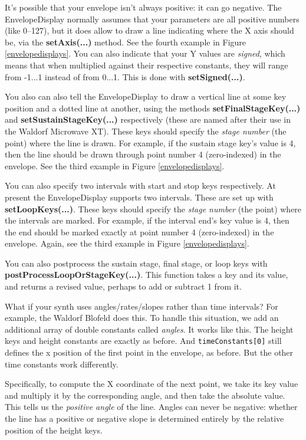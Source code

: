 \documentclass{article}
\begin{document}
\begin{itemize}
It's possible that your envelope isn't always positive: it can go negative.   The EnvelopeDisplay normally assumes that your parameters are all positive numbers (like 0--127), but it does allow to draw a line indicating where the X axis should be, via the {\bf setAxis(...)} method.  See the fourth example in Figure \ref{envelopedisplays}.  You can also indicate that your Y values are {\it signed}, which means that when multiplied against their respective constants, they will range from -1...1 instead of from 0...1.  This is done with {\bf setSigned(...)}.

You also can also tell the EnvelopeDisplay to draw a vertical line at some key position and a dotted line at another, using the methods {\bf setFinalStageKey(...)} and {\bf setSustainStageKey(...)} respectively (these are named after their use in the Waldorf Microwave XT).  These keys should specify the {\it stage number} (the point) where the line is drawn.  For example, if the sustain stage key's value is 4, then the line should be drawn through point number 4 (zero-indexed) in the envelope.  See the third example in Figure \ref{envelopedisplays}.

You can also specify two intervals with start and stop keys respectively.  At present the EnvelopeDisplay supports two intervals.  These are set up with {\bf setLoopKeys(...)}.   These keys should specify the {\it stage number} (the point) where the intervals are marked.  For example, if the interval end's key value is 4, then the end should be marked exactly at point number 4 (zero-indexed) in the envelope.  Again, see the third example in Figure \ref{envelopedisplays}.

You can also postprocess the sustain stage, final stage, or loop keys with {\bf postProcessLoopOrStageKey(...)}.  This function takes a key and its value, and returns a revised value, perhaps to add or subtract 1 from it.

What if your synth uses angles/rates/slopes rather than time intervals?  For example, the Waldorf Blofeld does this. To handle this situation, we add an additional array of double constants called {\it angles}.   It works like this.  The height keys and height constants are exactly as before.  And {\tt timeConstants[0]} still defines the x position of the first point in the envelope, as before.  But the other time constants work differently.

Specifically, to compute the X coordinate of the next point, we take its key value and multiply it by the corresponding angle, and then take the absolute value.  This tells us the {\it positive angle} of the line.  Angles can never be negative: whether the line has a positive or negative slope is determined entirely by the relative position of the height keys.


\end{itemize}
\end{document}

